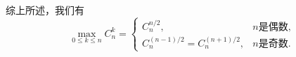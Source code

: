 \begin{example}
\begin{solution}
综上所述，我们有\begin{equation}
	\max_{0 \leq k \leq n} C_n^k = \left\{ \begin{array}{cl}
		C_n^{n/2}, & \text{$n$是偶数}, \\
		C_n^{(n-1)/2} = C_n^{(n+1)/2}, & \text{$n$是奇数}.
	\end{array} \right.
\end{equation}
\end{solution}
\end{example}
